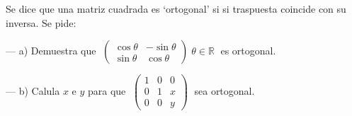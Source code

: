 \begin{ejre}
Se dice que una matriz cuadrada es `ortogonal' si si traspuesta coincide con su inversa. Se pide:

\noindent --- a) Demuestra que $\; \left( \begin{array}{cc} \cos \theta & -\sin \theta \\ \sin \theta & \cos \theta   \end{array} \right) \; \theta \in \mathbb R\; $ es ortogonal.

\noindent --- b) Calula $x$ e $y$ para que $\; \left( \begin{array}{ccc}   1&0&0 \\ 0&1&x \\0&0&y  \end{array} \right) \; $ sea ortogonal.
\end{ejre}

